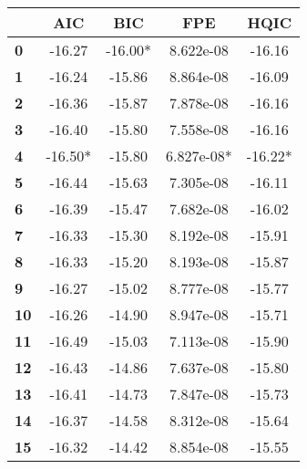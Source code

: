 \begin{center}
\begin{tabular}{lcccc}
\toprule
            & \textbf{AIC} & \textbf{BIC} & \textbf{FPE} & \textbf{HQIC}  \\
\midrule
\textbf{0}  &      -16.27  &     -16.00*  &   8.622e-08  &       -16.16   \\
\textbf{1}  &      -16.24  &      -15.86  &   8.864e-08  &       -16.09   \\
\textbf{2}  &      -16.36  &      -15.87  &   7.878e-08  &       -16.16   \\
\textbf{3}  &      -16.40  &      -15.80  &   7.558e-08  &       -16.16   \\
\textbf{4}  &     -16.50*  &      -15.80  &  6.827e-08*  &      -16.22*   \\
\textbf{5}  &      -16.44  &      -15.63  &   7.305e-08  &       -16.11   \\
\textbf{6}  &      -16.39  &      -15.47  &   7.682e-08  &       -16.02   \\
\textbf{7}  &      -16.33  &      -15.30  &   8.192e-08  &       -15.91   \\
\textbf{8}  &      -16.33  &      -15.20  &   8.193e-08  &       -15.87   \\
\textbf{9}  &      -16.27  &      -15.02  &   8.777e-08  &       -15.77   \\
\textbf{10} &      -16.26  &      -14.90  &   8.947e-08  &       -15.71   \\
\textbf{11} &      -16.49  &      -15.03  &   7.113e-08  &       -15.90   \\
\textbf{12} &      -16.43  &      -14.86  &   7.637e-08  &       -15.80   \\
\textbf{13} &      -16.41  &      -14.73  &   7.847e-08  &       -15.73   \\
\textbf{14} &      -16.37  &      -14.58  &   8.312e-08  &       -15.64   \\
\textbf{15} &      -16.32  &      -14.42  &   8.854e-08  &       -15.55   \\
\bottomrule
\end{tabular}
\end{center}